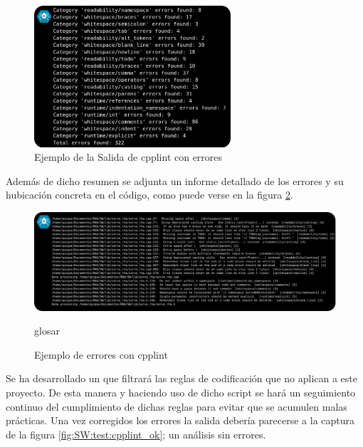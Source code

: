         \begin{figure}[H]
            \centering
            \includegraphics[width=0.65\textwidth]{figuras/Imagenes_SW/test/ReadibilityTest.jpg}
            \caption{Ejemplo de la Salida de cpplint con errores}
            \label{fig:SW:test:codif_output}
        \end{figure}

        Además de dicho resumen se adjunta un informe detallado de los errores y su hubicación concreta en el código, como puede verse en la figura \ref{fig:SW:test:error_output_cpplint}.

        \begin{figure}[H]
            \centering
            \includegraphics[width=1\textwidth]{figuras/Imagenes_SW/test/ReadibilityTest_2.jpg}
            \caption{Ejemplo de errores con cpplint}glosar
            \label{fig:SW:test:error_output_cpplint}
        \end{figure}

        Se ha desarrollado un  que filtrará las reglas de codificación que no aplican a este proyecto. De esta manera y haciendo uso de dicho script se hará un seguimiento continuo del cumplimiento de dichas reglas para evitar que se acumulen malas prácticas. Una vez corregidos los errores la salida debería parecerse a la captura de la figura \ref{fig:SW:test:cpplint_ok}; un análisis sin errores.

